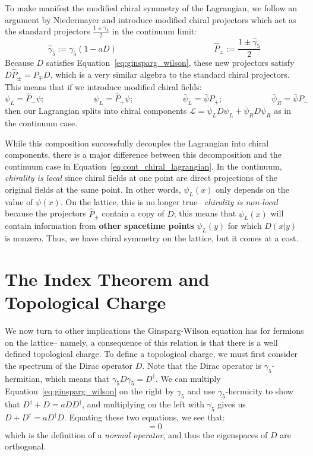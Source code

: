 \documentclass[11pt, oneside]{article}   	%
\theoremstyle{definition}
\begin{document}
To make manifest the modified chiral symmetry of the Lagrangian, we follow an argument by Niedermayer \cite{niedermayer} 
and introduce modified chiral projectors which act as the standard projectors $\frac{1\pm\gamma_5}{2}$ in the continuum limit:
\begin{equation}
	\hat\gamma_5 := \gamma_5 (1 - a D)\;\;\;\;\;\;\;\;\;\;\;\;\;\;\;\;\;\;\;\;\;\;\;\;\;\;\;\;\;\;\;\;\;\;\;\;\;\;\;\;\;\; \hat P_\pm := 
	\frac{1\pm\hat\gamma_5}{2}
\end{equation}
Because $D$ satisfies Equation~\ref{eq:ginsparg_wilson}, these new projectors satisfy $D\hat P_\pm = P_\mp D$, which is a 
very similar algebra to the standard chiral projectors. This means that if we introduce modified chiral fields:
\begin{equation}
	\psi_L = \hat P_-\psi ;\;\;\;\;\;\;\;\;\;\;\;\;\;\;\;\;\;\;\;\;\; \psi_L = \hat P_+\psi ;\;\;\;\;\;\;\;\;\;\;\;\;\;\;\;\;\;\;\;\;\; \bar\psi_L = \bar\psi 
	P_+ ;\;\;\;\;\;\;\;\;\;\;\;\;\;\;\;\;\;\;\;\;\; \bar\psi_R = \bar\psi P_-
\end{equation}
then our Lagrangian splits into chiral components $\mathcal L = \bar\psi_L D\psi_L + \bar\psi_R D\psi_R$ as in the continuum 
case. 

While this composition successfully decouples the Lagrangian into chiral components, there is a major difference between 
this decomposition and the continuum case in Equation~\ref{eq:cont_chiral_lagrangian}. In the continuum, \textit{chirality is 
local} since chiral fields at one point are direct projections of the original fields at the same point. In other words, $\psi_L(x)$ 
only depends on the value of $\psi(x)$. On the lattice, this is no longer true-- \textit{chirality is non-local} because the projectors 
$\hat P_\pm$ contain a copy of $D$; this means that $\psi_L(x)$ will contain information from \textbf{other spacetime points} 
$\psi_L(y)$ for which $D(x | y)$ is nonzero. Thus, we have chiral symmetry on the lattice, but it comes at a cost. 


\section{The Index Theorem and Topological Charge}

We now turn to other implications the Ginsparg-Wilson equation has for fermions on the lattice-- namely, a consequence of this 
relation is that there is a well defined topological charge. To define a topological charge, we must first consider the spectrum of 
the Dirac operator $D$. Note that the Dirac operator is $\gamma_5$-hermitian, which means that $\gamma_5 D\gamma_5 = 
D^\dagger$. We can multiply Equation~\ref{eq:ginsparg_wilson} on the right by $\gamma_5$ and use $\gamma_5$-hermicity to show that 
$D^\dagger + D = aDD^\dagger$, and multiplying on the left with $\gamma_5$ gives us $D + D^\dagger = aD^\dagger D$. Equating 
these two equations, we see that:
\begin{equation}
	[D, D^\dagger] = 0
\end{equation}
which is the definition of a \textit{normal operator}, and thus the eigenspaces of $D$ are orthogonal. 
\end{document}
